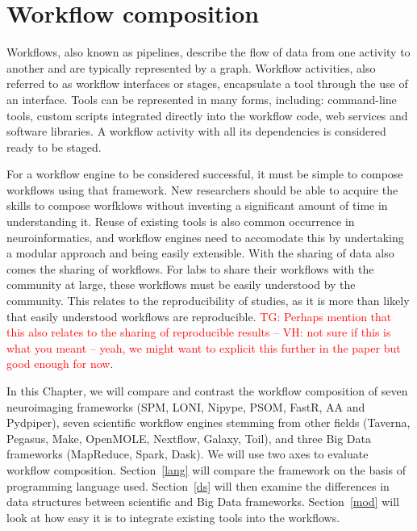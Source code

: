 \documentclass{report}
\newcommand{\tristan}[1]{\textcolor{red}{TG: #1}}
\begin{document}
    \chapter{Workflow composition}\label{workcomp}

        Workflows, also known as pipelines, describe the flow of data from one 
        activity to another and are typically represented by a graph. Workflow activities, also referred to as 
        workflow interfaces or stages, encapsulate a tool through the 
        use of an interface. Tools can be represented in many forms, 
        including: command-line tools, custom scripts integrated 
        directly into the workflow code, web services and software 
        libraries. A workflow activity with all its 
        dependencies is considered ready to be staged.

        For a workflow engine to be considered successful, it must be simple to 
        compose workflows using that framework. New researchers should be able 
        to acquire the skills to compose worfklows without
        investing a significant amount of time in understanding it. Reuse of
        existing tools is also common occurrence in neuroinformatics, and 
        workflow engines need to accomodate this by undertaking a modular 
        approach and being easily extensible. With the sharing of data also 
        comes the sharing of workflows. For labs to share their workflows with
        the community at large, these workflows must be easily understood by the
        community. This relates to the reproducibility of studies, as it is 
        more than likely that easily understood workflows are reproducible. 
        \tristan{Perhaps mention that this also relates to the sharing
        of reproducible results -- VH: not sure if this is what you meant --
        yeah, we might want to explicit this further in the paper but
        good enough for now}.

        In this Chapter, we will compare and contrast the workflow composition 
        of seven neuroimaging frameworks (SPM, LONI, Nipype, PSOM, FastR, AA and
        Pydpiper), seven scientific workflow engines stemming from other fields
        (Taverna, Pegasus, Make, OpenMOLE, Nextflow, Galaxy, Toil), and three
        Big Data frameworks (MapReduce, Spark, Dask). We will use two axes to
        evaluate workflow composition. Section~\ref{lang} will compare the 
        framework on the basis of programming language used. Section~\ref{ds}
        will then examine the differences in data structures between scientific
        and Big Data frameworks. 
        Section~\ref{mod} will look at how easy it is to integrate existing 
        tools into the workflows.
\end{document}
